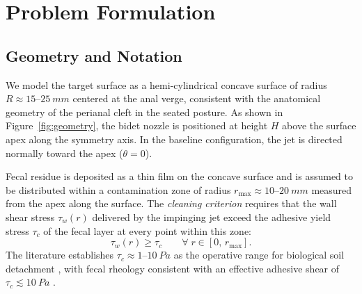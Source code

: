 \documentclass[aps,prfluids,reprint,amsmath,amssymb,floatfix]{revtex4-2}
\begin{document}
\section{Problem Formulation}
\label{sec:problem}

\subsection{Geometry and Notation}
\label{subsec:geometry}

We model the target surface as a hemi-cylindrical concave surface of
radius $R \approx 15$--$\SI{25}{mm}$ centered at the anal verge, consistent
with the anatomical geometry of the perianal cleft in the seated posture.
As shown in Figure~\ref{fig:geometry}, the bidet nozzle is positioned at
height $H$ above the surface apex along the symmetry axis. In the baseline
configuration, the jet is directed normally toward the apex ($\theta = 0$).

Fecal residue is deposited as a thin film on the concave surface and is
assumed to be distributed within a contamination zone of radius
$r_\mathrm{max} \approx 10$--$\SI{20}{mm}$ measured from the apex
along the surface. The \emph{cleaning criterion} requires that the wall
shear stress $\tau_w(r)$ delivered by the impinging jet exceed the
adhesive yield stress $\tau_c$ of the fecal layer at every point within
this zone:
\begin{equation}
  \tau_w(r) \geq \tau_c \qquad \forall\; r \in [0,\,r_\mathrm{max}].
  \label{eq:cleaningcriterion}
\end{equation}
The literature establishes $\tau_c \approx 1$--$\SI{10}{Pa}$ as the
operative range for biological soil detachment \citep{Ehedg2003,Phares2000},
with fecal rheology consistent with an effective adhesive shear of
$\tau_c \lesssim \SI{10}{Pa}$ \citep{Woolley2014}.
\end{document}
